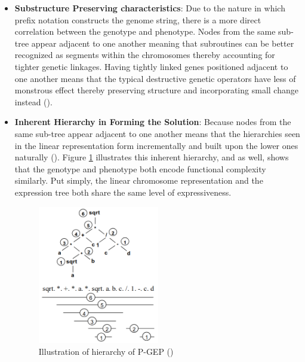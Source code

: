 \begin{itemize}
    \item \textbf{Substructure Preserving characteristics}: Due to the nature in which prefix notation constructs the genome string, there is a more direct correlation between the genotype and phenotype. Nodes from the same sub-tree appear adjacent to one another meaning that subroutines can be better recognized as segments within the chromosomes thereby accounting for tighter genetic linkages. Having tightly linked genes positioned adjacent to one another means that the typical destructive genetic operators have less of monstrous effect thereby preserving structure and incorporating small change instead (\cite{li2005prefix}).
    \item \textbf{Inherent Hierarchy in Forming the Solution}: Because nodes from the same sub-tree appear adjacent to one another means that the hierarchies seen in the linear representation form incrementally and built upon the lower ones naturally (\cite{li2005prefix}). Figure \ref{fig:p_gep} illustrates this inherent hierarchy, and as well, shows that the genotype and phenotype both encode functional complexity similarly. Put simply, the linear chromosome representation and the expression tree both share the same level of expressiveness.
    
    \begin{figure}[H] %
        \centering %
        \includegraphics[width=0.5\textwidth]{Figures/chapter_gep/p_gep.png} %
        \caption{Illustration of hierarchy of P-GEP (\cite{li2005prefix})}
        \label{fig:p_gep} %
    \end{figure}

\end{itemize}


